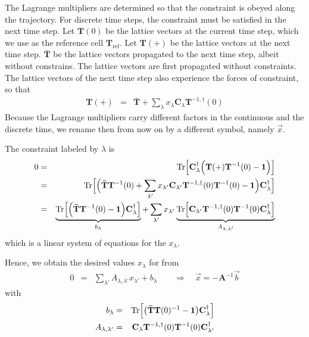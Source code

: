 \documentclass[final,12pt,makeidx,DIV=calc]{article}
\newcommand{\mat}[1]{\mathbf{#1}}
\newcommand{\Tr}{\mathrm{Tr}}      %
\begin{document}
{{{The Lagrange multipliers are determined so that the constraint is
obeyed along the trajectory. For discrete time steps, the constraint
must be satisfied in the next time step.  Let $\mat{T}(0)$ be the
lattice vectors at the current time step, which we use as the
reference cell $\mat{T}_{\text{ref}}$. Let $\mat{T}(+)$ be the lattice
vectors at the next time step.  $\mat{\bar{T}}$ be the lattice vectors
propagated to the next time step, albeit without constrains.  The
lattice vectors are first propagated without constraints. The lattice
vectors of the next time step also experience the forces of
constraint, so that
\begin{eqnarray}
\mat{T}(+)&=&\mat{\bar{T}}+\sum_{\lambda}x_\lambda\mat{C}_\lambda
\mat{T}^{-1,\dagger}(0)
\end{eqnarray}
Because the Lagrange multipliers carry different factors in the
continuous and the discrete time, we rename then from now on by a
different symbol, namely $\vec{x}$. 

The constraint labeled by $\lambda$ is
\begin{eqnarray}
0&=&\Tr\Bigl[\mat{C}^\dagger_\lambda
                  \Bigl(\mat{T}(+)\mat{T}^{-1}(0)-\mat{1}\Bigr)
                  \Bigr]
\nonumber\\
&=& \Tr\Bigl[\Bigl(\mat{\bar{T}}\mat{T}^{-1}(0)
+\sum_{\lambda'}x_{\lambda'} \mat{C}_{\lambda'}\mat{T}^{-1,\dagger}(0)\mat{T}^{-1}(0)
-\mat{1}\Bigr)\mat{C}^\dagger_\lambda\Bigr]
\nonumber\\
&=& 
\underbrace{
\Tr\Bigl[\Bigl(\mat{\bar{T}}\mat{T}^{-1}(0)
-\mat{1}\Bigr)\mat{C}^\dagger_\lambda\Bigr]}_{b_\lambda}
+\sum_{\lambda'}x_{\lambda'} 
\underbrace{
\Tr\Bigl[
\mat{C}_{\lambda'}\mat{T}^{-1,\dagger}(0)\mat{T}^{-1}(0)
\mat{C}^\dagger_\lambda\Bigr]
}_{A_{\lambda,\lambda'}}
\end{eqnarray}
which is a linear system of equations for the $x_\lambda$.

Hence, we obtain the desired values $x_\lambda$ for from
  \begin{eqnarray}
0&=&\sum_{\lambda'}A_{\lambda,\lambda'}x_{\lambda'}+b_\lambda 
\qquad\Rightarrow\quad \vec{x}=-\mat{A}^{-1}\vec{b}
  \end{eqnarray}
with
  \begin{eqnarray}
    b_\lambda&=&\Tr\Bigl[\bigl(\mat{\bar{T}}\mat{T}(0)^{-1}-\mat{1}\bigr)
                      \mat{C}_\lambda^\dagger\Bigr]
 \nonumber\\
    A_{\lambda,\lambda'}
        &=&\mat{C}_\lambda \mat{T}^{-1,\dagger}(0)\mat{T}^{-1}(0)\mat{C}^\dagger_{\lambda'}
  \end{eqnarray}



}}}
\end{document}
